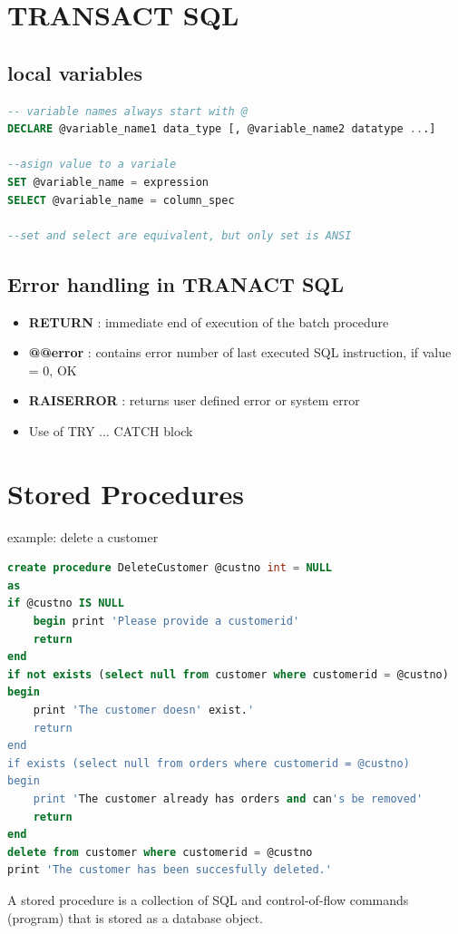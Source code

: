 \documentclass{report}
\begin{document}
	\section{TRANSACT SQL}
	\subsection{local variables}
	\begin{lstlisting}[language = sql]
-- variable names always start with @
DECLARE @variable_name1 data_type [, @variable_name2 datatype ...]

--asign value to a variale 
SET @variable_name = expression
SELECT @variable_name = column_spec

--set and select are equivalent, but only set is ANSI	\end{lstlisting}
	\subsection{Error handling in TRANACT SQL}
	\begin{itemize}
		\item \textbf{RETURN} : immediate end of execution of the batch procedure
		\item \textbf{@@error} : contains error number of last executed SQL instruction, if value = 0, OK
		\item \textbf{RAISERROR} : returns user defined error or system error 
		\item Use of TRY ...  CATCH block
	\end{itemize}
	\section{Stored Procedures}
	example: delete a customer
	\begin{lstlisting}[language = sql]
create procedure DeleteCustomer @custno int = NULL
as
if @custno IS NULL	
	begin print 'Please provide a customerid'
	return 
end
if not exists (select null from customer where customerid = @custno)
begin
	print 'The customer doesn' exist.'
	return 
end 
if exists (select null from orders where customerid = @custno)
begin 
	print 'The customer already has orders and can's be removed'
	return 
end
delete from customer where customerid = @custno
print 'The customer has been succesfully deleted.'\end{lstlisting}
	 A stored procedure is a collection of SQL and control-of-flow commands (program) that is stored as a database object.
\end{document}
